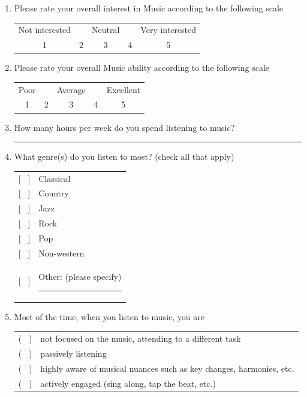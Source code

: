 \documentclass[a4paper,11pt]{article}
\newcommand{\myunderline}{\rule{2in}{.5pt}}
\begin{document}
{\begin{appendices}
\begin{enumerate}[resume]
	\item Please rate your overall interest in Music according to the following scale

	\begin{tabular}{c c c c c}
		Not interested & & Neutral & & Very interested \\
		1 & 2 & 3 & 4 & 5 \\
	\end{tabular}

	\item Please rate your overall Music ability according to the following scale

	\begin{tabular}{c c c c c}
		Poor & & Average & & Excellent \\
		1 & 2 & 3 & 4 & 5 \\
	\end{tabular}

	\item How many hours per week do you spend listening to music?

	\myunderline

	\item What genre(s) do you listen to most? (check all that apply)

	\begin{tabular}{l l}
		{[{ \ }]} & Classical \\
		{[{ \ }]} & Country \\
		{[{ \ }]} & Jazz \\
		{[{ \ }]} & Rock \\
		{[{ \ }]} & Pop \\
		{[{ \ }]} & Non-western \\
		{[{ \ }]} & Other: (please specify) \myunderline \\
	\end{tabular}

	\item Most of the time, when you listen to music, you are

	\begin{tabular}{l l}
		( \ ) & not focused on the music, attending to a different task \\
		( \ ) & passively listening \\
		( \ ) & highly aware of musical nuances such as key changes, harmonies, etc. \\
		( \ ) & actively engaged (sing along, tap the beat, etc.) \\
	\end{tabular}


\end{enumerate}
\end{appendices}}
\end{document}
